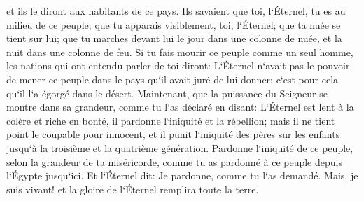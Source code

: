 \verse et ils le diront aux habitants de ce pays. Ils savaient que toi, l`Éternel, tu es au milieu de ce peuple; que tu apparais visiblement, toi, l`Éternel; que ta nuée se tient sur lui; que tu marches devant lui le jour dans une colonne de nuée, et la nuit dans une colonne de feu. 
\verse Si tu fais mourir ce peuple comme un seul homme, les nations qui ont entendu parler de toi diront: 
\verse L`Éternel n`avait pas le pouvoir de mener ce peuple dans le pays qu`il avait juré de lui donner: c`est pour cela qu`il l`a égorgé dans le désert. 
\verse Maintenant, que la puissance du Seigneur se montre dans sa grandeur, comme tu l`as déclaré en disant: 
\verse L`Éternel est lent à la colère et riche en bonté, il pardonne l`iniquité et la rébellion; mais il ne tient point le coupable pour innocent, et il punit l`iniquité des pères sur les enfants jusqu`à la troisième et la quatrième génération. 
\verse Pardonne l`iniquité de ce peuple, selon la grandeur de ta miséricorde, comme tu as pardonné à ce peuple depuis l`Égypte jusqu`ici. 
\verse Et l`Éternel dit: Je pardonne, comme tu l`as demandé. 
\verse Mais, je suis vivant! et la gloire de l`Éternel remplira toute la terre. 
